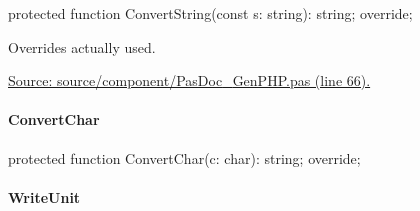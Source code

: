 \documentclass{report}
\newif\ifpdf
\begin{document}
\label{PasDoc_GenPHP.TPHPDocGenerator-ConvertString}
\begin{list}{}{
\setlength{\itemindent}{0cm}
\setlength{\listparindent}{0cm}
\setlength{\leftmargin}{\evensidemargin}
\addtolength{\leftmargin}{\tmplength}
\settowidth{\labelsep}{X}
\addtolength{\leftmargin}{\labelsep}
\setlength{\labelwidth}{\tmplength}
}
\item[\textbf{Declaration}\hfill]
\ifpdf
\begin{flushleft}
\fi
\begin{ttfamily}
protected function ConvertString(const s: string): string; override;\end{ttfamily}

\ifpdf
\end{flushleft}
\fi

\par
\item[\textbf{Description}]
Overrides actually used.\par
\href{https://github.com/pasdoc/pasdoc/blob/master/source/component/PasDoc_GenPHP.pas#L66}{Source: source/component/PasDoc{\_}GenPHP.pas (line 66).}

\end{list}
\paragraph*{ConvertChar}\hspace*{\fill}

\label{PasDoc_GenPHP.TPHPDocGenerator-ConvertChar}
\begin{list}{}{
\setlength{\itemindent}{0cm}
\setlength{\listparindent}{0cm}
\setlength{\leftmargin}{\evensidemargin}
\addtolength{\leftmargin}{\tmplength}
\settowidth{\labelsep}{X}
\addtolength{\leftmargin}{\labelsep}
\setlength{\labelwidth}{\tmplength}
}
\item[\textbf{Declaration}\hfill]
\ifpdf
\begin{flushleft}
\fi
\begin{ttfamily}
protected function ConvertChar(c: char): string; override;\end{ttfamily}

\ifpdf
\end{flushleft}
\fi

\end{list}
\paragraph*{WriteUnit}\hspace*{\fill}
\end{document}
